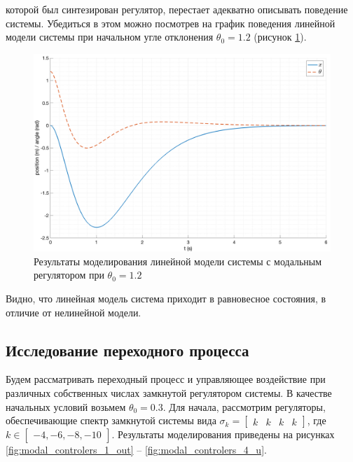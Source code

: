 которой был синтезирован регулятор, перестает адекватно описывать поведение системы. Убедиться в этом можно 
посмотрев на график поведения линейной модели системы при начальном угле отклонения $\theta_0 = 1.2$ (рисунок \ref{fig:modal_control_linear_out_6}).
\begin{figure}[ht!]
    \centering
    \includegraphics[width=\textwidth]{media/plots/modal_control/modal_control_linear_out_6.png}
    \caption{Результаты моделирования линейной модели системы с модальным регулятором при $\theta_0 = 1.2$}
    \label{fig:modal_control_linear_out_6}
\end{figure}
Видно, что линейная модель система приходит в равновесное состояния, в отличие от нелинейной модели.

\subsection{Исследование переходного процесса}
Будем рассматривать переходный процесс и управляющее воздействие при различных собственных числах замкнутой регулятором системы. 
В качестве начальных условий возьмем $\theta_0 = 0.3$. Для начала, рассмотрим регуляторы, обеспечивающие спектр 
замкнутой системы вида $\sigma_k = \begin{bmatrix}k & k & k & k\end{bmatrix}$, где $k \in \begin{bmatrix}-4, -6, -8, -10\end{bmatrix}$. 
Результаты моделирования приведены на рисунках \ref{fig:modal_controlers_1_out} -- \ref{fig:modal_controlers_4_u}.


